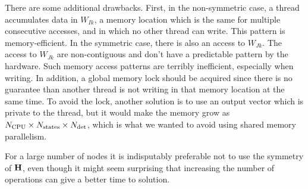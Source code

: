 \documentclass[./thesis.tex]{subfiles}
\begin{document}
There are some additional drawbacks.
First, in the non-symmetric case, a thread accumulates data in $W_{Ik}$, a memory
location which is the same for multiple consecutive accesses, and in which no other
thread can write. This pattern is memory-efficient.
In the symmetric case, there is also an access to $W_{Jk}$. The access to
$W_{Jk}$ are non-contiguous and don't have a predictable pattern by the hardware.
Such memory access patterns are terribly inefficient, especially when writing.
In addition, a global memory lock should be acquired since there is no
guarantee than another thread is not writing in that memory location at the
same time. To avoid the lock, another solution is to use an output vector which
is private to the thread, but it would make the memory grow as $N_\text{CPU}
\times {N_\text{states}} \times {N_\text{det}}$, which is what
we wanted to avoid using shared memory parallelism.

For a large number of nodes it is indisputably preferable not to use the
symmetry of $\mathbf{H}$, even though it might seem surprising that increasing the
number of operations can give a better time to solution.

%
%
\end{document}
